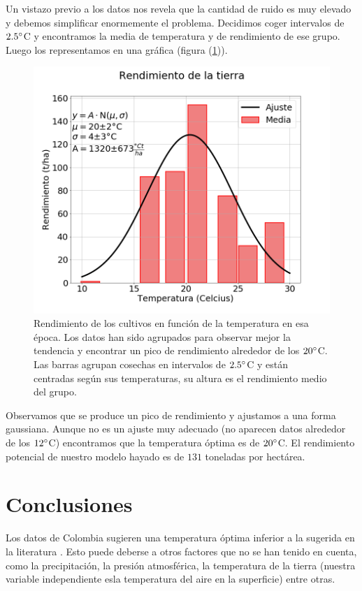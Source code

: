 \documentclass[12pt, spanish]{article}
\begin{document}
Un vistazo previo a los datos nos revela que la cantidad de ruido es muy elevado y debemos simplificar enormemente el problema. Decidimos coger intervalos de $2.5\degree$C y encontramos la media de temperatura y de rendimiento de ese grupo. Luego los representamos en una gráfica (figura (\ref{fig:rendimiento})).

\begin{figure}[H]
	\includegraphics[width=0.6\linewidth]{./figures/rendimiento.png} %
	\caption{Rendimiento de los cultivos en función de la temperatura en esa época. Los datos han sido agrupados para observar mejor la tendencia y encontrar un pico de rendimiento alrededor de los $20\degree$C. Las barras agrupan cosechas en intervalos de $2.5\degree$C y están centradas según sus temperaturas, su altura es el rendimiento medio del grupo.}
	\label{fig:rendimiento}
\end{figure}

Observamos que se produce un pico de rendimiento y ajustamos a una forma gaussiana. Aunque no es un ajuste muy adecuado (no aparecen datos alrededor de los $12\degree$C) encontramos que la temperatura óptima es de $20\degree$C. 
El rendimiento potencial de nuestro modelo hayado es de $131$ toneladas por hectárea.



\section{Conclusiones}

Los datos de Colombia sugieren una temperatura óptima inferior a la sugerida en la literatura \cite{Fisiomaizfenalce2011}.
Esto puede deberse a otros factores que no se han tenido en cuenta, como la precipitación, la presión atmosférica, la temperatura de la tierra (nuestra variable independiente esla temperatura del aire en la superficie) entre otras.
\end{document}
